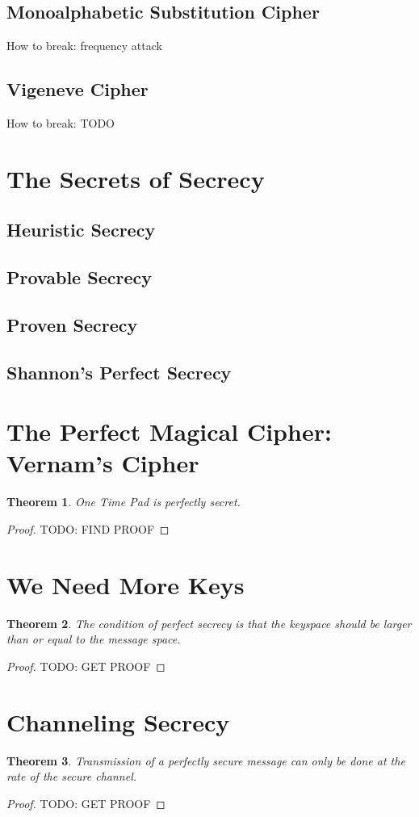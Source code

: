 \documentclass[letterpaper,12pt]{article}
\newtheorem{theorem}{Theorem}
\begin{document}
\subsection{Monoalphabetic Substitution Cipher}

How to break: frequency attack

\subsection{Vigeneve Cipher}

How to break: TODO

\section{The Secrets of Secrecy}

\subsection{Heuristic Secrecy}
\subsection{Provable Secrecy}
\subsection{Proven Secrecy}
\subsection{Shannon's Perfect Secrecy}

\section{The Perfect Magical Cipher: Vernam's Cipher}

\begin{theorem}
One Time Pad is perfectly secret.
\end{theorem}

\begin{proof}
TODO: FIND PROOF
\end{proof}

\section{We Need More Keys}

\begin{theorem}
The condition of perfect secrecy is that the keyspace should be larger than or equal to the message space.
\end{theorem}

\begin{proof}
TODO: GET PROOF
\end{proof}

\section{Channeling Secrecy}

\begin{theorem}
Transmission of a perfectly secure message can only be done at the rate of the secure channel.
\end{theorem}

\begin{proof}
TODO: GET PROOF
\end{proof}
\end{document}
